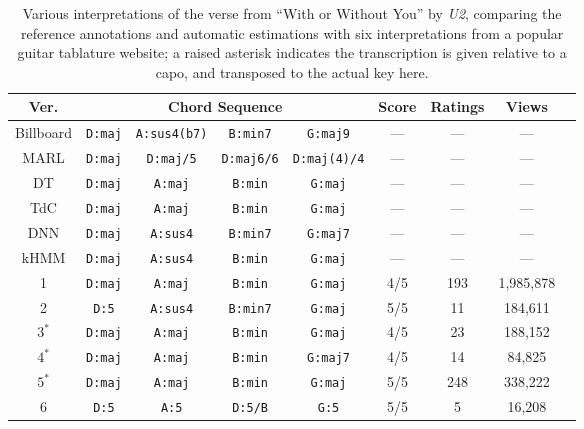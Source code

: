 \documentclass{article}
\begin{document}
\begin{table}[!t]
\small
\centering
\begin{tabular}{ c || c c c c | c c c c |}
Ver. & \multicolumn{4}{c}{Chord Sequence} & Score & Ratings & Views \\
 \hline
 Billboard & \texttt{D:maj} & \texttt{A:sus4(b7)} & \texttt{B:min7} & \texttt{G:maj9} & --- & --- & --- \\
 MARL & \texttt{D:maj} & \texttt{D:maj/5} & \texttt{D:maj6/6} & \texttt{D:maj(4)/4} & --- & --- & --- \\
 DT & \texttt{D:maj} & \texttt{A:maj} & \texttt{B:min} & \texttt{G:maj} & --- & --- & --- \\
 TdC & \texttt{D:maj} & \texttt{A:maj} & \texttt{B:min} & \texttt{G:maj} & --- & --- & --- \\
\hline
DNN & \texttt{D:maj} & \texttt{A:sus4} & \texttt{B:min7} & \texttt{G:maj7} & --- & --- & --- \\
kHMM & \texttt{D:maj} & \texttt{A:sus4} & \texttt{B:min} & \texttt{G:maj} & --- & --- & --- \\
\hline
1 & \texttt{D:maj} & \texttt{A:maj} & \texttt{B:min} & \texttt{G:maj} & 4/5 & 193 & 1,985,878 \\
2 & \texttt{D:5} & \texttt{A:sus4} & \texttt{B:min7} & \texttt{G:maj} & 5/5 & 11 & 184,611 \\
$3^*$ & \texttt{D:maj} & \texttt{A:maj} & \texttt{B:min} & \texttt{G:maj} & 4/5 & 23 & 188,152 \\
$4^*$ & \texttt{D:maj} & \texttt{A:maj} & \texttt{B:min} & \texttt{G:maj7} & 4/5 & 14 & 84,825 \\
$5^*$ & \texttt{D:maj} & \texttt{A:maj} & \texttt{B:min} & \texttt{G:maj} & 5/5 & 248 & 338,222 \\
6 & \texttt{D:5} & \texttt{A:5} & \texttt{D:5/B} & \texttt{G:5} & 5/5 & 5 & 16,208 \\
\hline
\end{tabular}
\caption{Various interpretations of the verse from ``With or Without You'' by \emph{U2}, comparing the reference annotations and automatic estimations with six interpretations from a popular guitar tablature website; a raised asterisk indicates the transcription is given relative to a capo, and transposed to the actual key here.}
\label{tab:wowu_chords}
\end{table}
\end{document}
